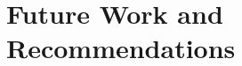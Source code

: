 \documentclass[future.tex]{subfiles}
\begin{document}
\section{Future Work and Recommendations} %
\label{sec:future_work_and_recommendations}

\end{document}
